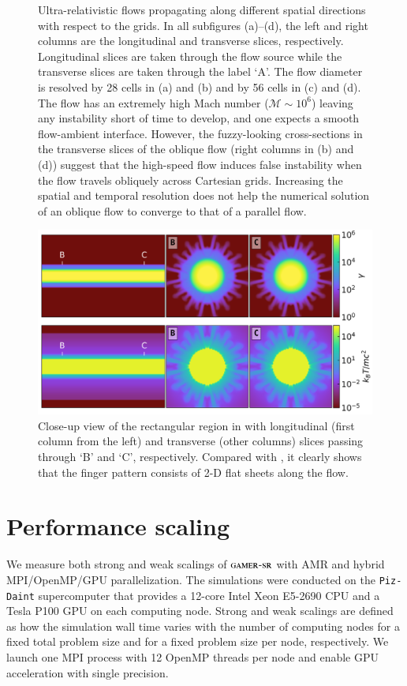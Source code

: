 \documentclass[twocolumn]{aastex63}
\begin{document}
\begin{figure}
{      \label{fig:DiagonalFlowHig} %
    }
  \caption{
Ultra-relativistic flows propagating along different spatial directions with respect to the grids. In all subfigures (a)--(d), the left and right columns are the longitudinal and transverse slices, respectively. Longitudinal slices are taken through the flow source while the transverse slices are taken through the label `A'. The flow diameter is resolved by 28 cells in (a) and (b) and by 56 cells in (c) and (d). The flow has an extremely high Mach number ($\mathscr{M}\sim 10^{6}$) leaving any instability short of time to develop, and one expects a smooth flow-ambient interface. However, the fuzzy-looking cross-sections in the transverse slices of the oblique flow (right columns in (b) and (d)) suggest that the high-speed flow induces false instability when the flow travels obliquely across Cartesian grids. Increasing the spatial and temporal resolution does not help the numerical solution of an oblique flow to converge to that of a parallel flow.}
  \label{fig:GridEffect}
\end{figure}






\begin{figure}
\includegraphics[width=\columnwidth]{fig__HorizontalFlowHigZoomIn.png}
\centering
\caption{Close-up view of the rectangular region in  with longitudinal (first column from the left) and transverse (other columns) slices passing through `B' and `C', respectively. Compared with , it clearly shows that the finger pattern consists of 2-D flat sheets along the flow.}
\label{fig:HorizontalFlowHigZoomIn}
\end{figure}

\section{Performance scaling}
\label{Performance scaling}
We measure both strong and weak scalings of $\textsc{gamer-sr}$ with AMR and hybrid MPI/OpenMP/GPU
parallelization. The simulations were conducted on the \texttt{Piz-Daint} supercomputer that provides a 12-core Intel Xeon E5-2690 CPU and a Tesla P100 GPU on each computing node. Strong and weak scalings are defined as how the simulation wall time varies with the number of computing nodes for a fixed total problem size and for a fixed problem size per node, respectively. We launch one MPI process with 12 OpenMP threads per node and enable GPU acceleration with single precision.
\end{document}
